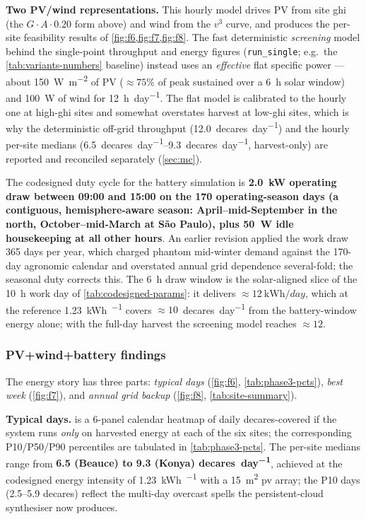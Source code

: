 \documentclass[11pt,a4paper]{article}
\begin{document}
\textbf{Two PV/wind representations.} This hourly model drives PV from site \gls{ghi} (the $G\cdot A\cdot 0.20$ form above) and wind from the $v^3$ curve, and produces the per-site feasibility results of \cref{fig:f6,fig:f7,fig:f8}. The fast deterministic \emph{screening} model behind the single-point throughput and energy figures (\texttt{run\_single}; e.g.\ the \cref{tab:variants-numbers} baseline) instead uses an \emph{effective} flat specific power --- about \SI{150}{\watt\per\meter\squared} of PV (${\approx}75\%$ of peak sustained over a \SI{6}{\hour} solar window) and \SI{100}{\watt} of wind for \SI{12}{\hour\per day}. The flat model is calibrated to the hourly one at high-\gls{ghi} sites and somewhat overstates harvest at low-\gls{ghi} sites, which is why the deterministic off-grid throughput (\SI{12.0}{decares\per day}) and the hourly per-site medians (\SIrange{6.5}{9.3}{decares\per day}, harvest-only) are reported and reconciled separately (\cref{sec:mc}).

The codesigned duty cycle for the battery simulation is \textbf{\SI{2.0}{\kilo\watt} operating draw between 09:00 and 15:00 on the 170 operating-season days (a contiguous, hemisphere-aware season: April--mid-September in the north, October--mid-March at São Paulo), plus \SI{50}{\watt} idle housekeeping at all other hours}. An earlier revision applied the work draw 365 days per year, which charged phantom mid-winter demand against the 170-day agronomic calendar and overstated annual grid dependence several-fold; the seasonal duty corrects this. The \SI{6}{\hour} draw window is the solar-aligned slice of the \SI{10}{\hour} work day of \cref{tab:codesigned-params}: it delivers ${\approx}\SI{12}{\kWh\per day}$, which at the reference \SI{1.23}{\kWh\per\decare} covers ${\approx}10$~\si{decares\per day} from the battery-window energy alone; with the full-day harvest the screening model reaches ${\approx}12$.

\subsubsection{PV+wind+battery findings}\label{sec:phase3-findings}

The energy story has three parts: \emph{typical days} (\cref{fig:f6}, \cref{tab:phase3-pcts}), \emph{best week} (\cref{fig:f7}), and \emph{annual grid backup} (\cref{fig:f8}, \cref{tab:site-summary}).

\textbf{Typical days.}  is a 6-panel calendar heatmap of daily decares-covered if the system runs \emph{only} on harvested energy at each of the six sites; the corresponding P10/P50/P90 percentiles are tabulated in \cref{tab:phase3-pcts}. The per-site medians range from \textbf{6.5 (Beauce) to 9.3 (Konya) \si{decares\per day}}, achieved at the codesigned energy intensity of \SI{1.23}{\kWh\per\decare} with a \SI{15}{\meter\squared} \gls{pv} array; the P10 days (2.5--5.9 decares) reflect the multi-day overcast spells the persistent-cloud synthesiser now produces.
\end{document}
